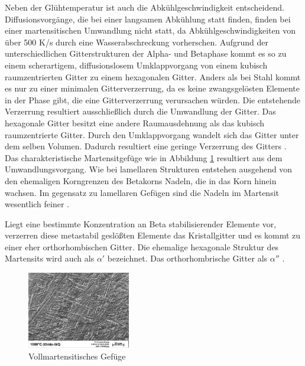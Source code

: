 \documentclass[a4paper, 11pt]{tubsreprt}
\begin{document}
Neben der Glühtemperatur ist auch die Abkühlgeschwindigkeit entscheidend. Diffusionsvorgänge, die bei einer langsamen Abkühlung statt finden, finden bei einer martensitischen Umwandlung nicht statt, da Abkühlgeschwindigkeiten von über 500 K/s durch eine Wasserabschreckung vorherschen. Aufgrund der unterschiedlichen Gitterstrukturen der Alpha- und Betaphase kommt es so zu einem scherartigem, diffusionslosem Umklappvorgang von einem kubisch raumzentrierten Gitter zu einem hexagonalen Gitter. Anders als bei Stahl kommt es nur zu einer minimalen Gitterverzerrung, da es keine zwangsgelösten Elemente in der Phase gibt, die eine Gitterverzerrung verursachen würden. Die entstehende Verzerrung resultiert ausschließlich durch die Umwandlung der Gitter. Das hexagonale Gitter besitzt eine andere Raumausdehnung als das kubisch raumzentrierte Gitter. Durch den Umklappvorgang wandelt sich das Gitter unter dem selben Volumen. Dadurch resultiert eine geringe Verzerrung des Gitters \cite{Luetjering2007}. Das charakteristische Martensitgefüge wie in Abbildung \ref{vollmartensit} resultiert aus dem Umwandlungsvorgang. Wie bei lamellaren Strukturen entstehen ausgehend von den ehemaligen Korngrenzen des Betakorns Nadeln, die in das Korn hinein wachsen. Im gegensatz zu lamellaren Gefügen sind die Nadeln im Martensit wesentlich feiner \cite{Luetjering2007}.

Liegt eine bestimmte Konzentration an Beta stabilisierender Elemente vor, verzerren diese metastabil geslößten Elemente das Kristallgitter und es kommt zu einer eher orthorhombischen Gitter. Die ehemalige hexagonale Struktur des Martensits wird auch als $\alpha'$ bezeichnet. Das orthorhombrische Gitter als $\alpha''$ \cite{Luetjering2007}. 

\begin{figure}
\centering
\includegraphics[width=0.4\textwidth]{Bilder/Vollmartensit.jpg}
\caption{Vollmartensitisches Gefüge}
\label{vollmartensit}
\end{figure}
\end{document}
